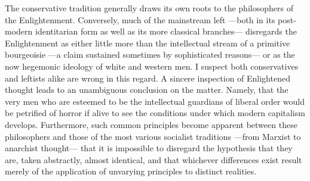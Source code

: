 \documentclass[a4paper]{article}
\begin{document}
The conservative tradition generally draws its own roots to the philosophers of
the Enlightenment. Conversely, much of the mainstream left ---both in its
post-modern identitarian form as well as its more classical branches---
disregards the Enlightenment as either little more than the intellectual
stream of a primitive bourgeoisie ---a claim sustained sometimes by sophisticated
reasons--- or as the now hegemonic ideology of white and western men. I suspect both
conservatives and leftists alike are wrong in this regard. A sincere inspection
of Enlightened thought leads to an unambiguous conclusion on the matter. Namely,
that the very men who are esteemed to be the intellectual guardians of liberal
order would be petrified of horror if alive to see the conditions under which
modern capitalism develops. Furthermore, such common principles become apparent
between these philosophers and those of the most various socialist traditions
---from Marxist to anarchist thought--- that it is impossible to disregard the
hypothesis that they are, taken abstractly, almost identical, and that whichever
differences exist result merely of the application of unvarying principles to
distinct realities.




    
\end{document}
